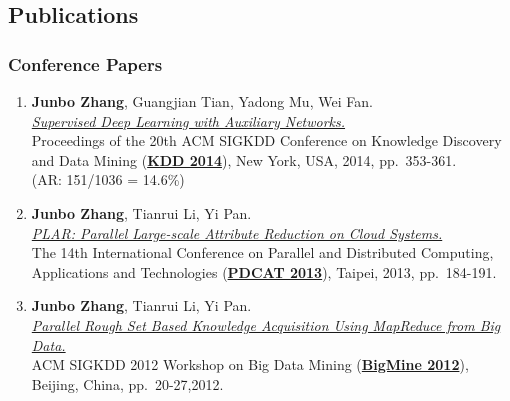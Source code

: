 \documentclass[10pt,a4paper]{article}
\begin{document}
\iffalse

\subsection{Research Interests}\label{research-interests}

\begin{itemize}
\itemsep1pt\parskip0pt\parsep0pt
\item
  Deep Learning, Representation Learning, Feature Engineering
\item
  Cloud Computing, Distributed Computing, High Performance Computing
\item
  Big Data Mining
\item
  Rough Sets/Fuzzy Sets
\end{itemize}

\fi

\subsection{Publications}\label{publications}

\small

\subsubsection{Conference Papers}\label{conference-papers}

\begin{enumerate}
\def\labelenumi{\arabic{enumi}.}
\item
  \textbf{Junbo Zhang}, Guangjian Tian, Yadong Mu, Wei Fan.\\
  \href{http://dx.doi.org/10.1145/2623330.2623618}{\emph{Supervised Deep
  Learning with Auxiliary Networks.}}\\ Proceedings of the 20th ACM
  SIGKDD Conference on Knowledge Discovery and Data Mining
  (\href{http://www.kdd.org/kdd2014/}{\textbf{KDD 2014}}), New York,
  USA, 2014, pp.~353-361.\\ (AR: 151/1036 = 14.6\%)
\item
  \textbf{Junbo Zhang}, Tianrui Li, Yi Pan.\\
  \href{http://dx.doi.org/10.1109/PDCAT.2013.36}{\emph{PLAR: Parallel
  Large-scale Attribute Reduction on Cloud Systems.}}\\ The 14th
  International Conference on Parallel and Distributed Computing,
  Applications and Technologies
  (\href{http://pdcat13.csie.ntust.edu.tw/}{\textbf{PDCAT 2013}}),
  Taipei, 2013, pp.~184-191.
\item
  \textbf{Junbo Zhang}, Tianrui Li, Yi Pan.\\
  \href{http://doi.acm.org/10.1145/2351316.2351320}{\emph{Parallel Rough
  Set Based Knowledge Acquisition Using MapReduce from Big Data.}}\\ ACM
  SIGKDD 2012 Workshop on Big Data Mining
  (\href{http://kdd2012.sigkdd.org/workshops.shtml}{\textbf{BigMine
  2012}}), Beijing, China, pp.~20-27,2012.
\end{enumerate}
\end{document}
